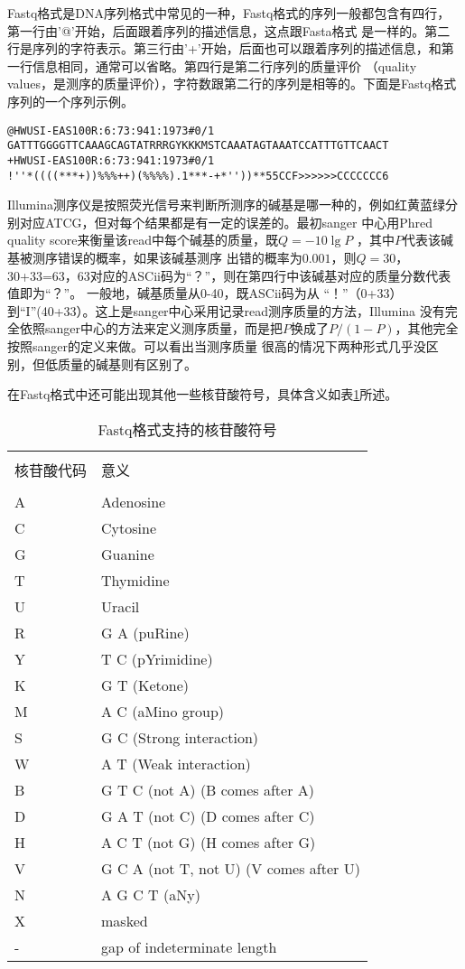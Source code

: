 Fastq格式是DNA序列格式中常见的一种，Fastq格式的序列一般都包含有四行，第一行由'@'开始，后面跟着序列的描述信息，这点跟Fasta格式
是一样的。第二行是序列的字符表示。第三行由'+'开始，后面也可以跟着序列的描述信息，和第一行信息相同，通常可以省略。第四行是第二行序列的质量评价
（quality values，是测序的质量评价），字符数跟第二行的序列是相等的。下面是Fastq格式序列的一个序列示例。

\begin{verbatim}
@HWUSI-EAS100R:6:73:941:1973#0/1
GATTTGGGGTTCAAAGCAGTATRRRGYKKKMSTCAAATAGTAAATCCATTTGTTCAACT
+HWUSI-EAS100R:6:73:941:1973#0/1
!''*((((***+))%%%++)(%%%%).1***-+*''))**55CCF>>>>>>CCCCCCC6
\end{verbatim}

Illumina测序仪是按照荧光信号来判断所测序的碱基是哪一种的，例如红黄蓝绿分别对应ATCG，但对每个结果都是有一定的误差的。最初sanger
中心用Phred quality score来衡量该read中每个碱基的质量，既$Q=-10\lg P$ ，其中$P$代表该碱基被测序错误的概率，如果该碱基测序
出错的概率为$0.001$，则$Q=30$，30+33=63，63对应的ASCii码为“？”，则在第四行中该碱基对应的质量分数代表值即为“？”。
一般地，碱基质量从0-40，既ASCii码为从 “！”（0+33）到“I”(40+33）。这上是sanger中心采用记录read测序质量的方法，Illumina
没有完全依照sanger中心的方法来定义测序质量，而是把$P$换成了$P/(1-P)$，其他完全按照sanger的定义来做。可以看出当测序质量
很高的情况下两种形式几乎没区别，但低质量的碱基则有区别了。

在Fastq格式中还可能出现其他一些核苷酸符号，具体含义如表\ref{tab:tabatcg}所述。

\begin{table}[htbp]
    \caption{Fastq格式支持的核苷酸符号}
    \label{tab:tabatcg}
    \centering
    \begin{tabular}{ll}
        \hline\\
        核苷酸代码&意义\\
        \hline\\
        A & Adenosine \\
        C & Cytosine \\
        G & Guanine \\
        T & Thymidine \\
        U & Uracil \\
        R & G A (puRine) \\
        Y & T C (pYrimidine) \\
        K & G T (Ketone) \\
        M & A C (aMino group) \\
        S & G C (Strong interaction)\\
        W & A T (Weak interaction) \\
        B & G T C (not A) (B comes after A)\\
        D & G A T (not C) (D comes after C) \\
        H & A C T (not G) (H comes after G) \\
        V & G C A (not T, not U) (V comes after U)\\
        N & A G C T (aNy)\\
        X & masked \\
        - & gap of indeterminate length
    \end{tabular}
\end{table}

